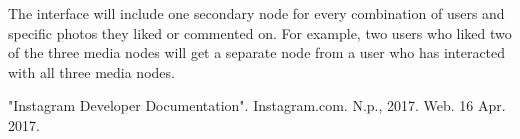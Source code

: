 \documentclass[journal]{vgtc}                %
\begin{document}
The interface will include one secondary node for every combination of users and specific photos they liked or commented on. For example, two users who liked two of the three media nodes will get a separate node from a user who has interacted with all three media nodes.




%

%
%
%


"Instagram Developer Documentation". Instagram.com. N.p., 2017. Web. 16 Apr. 2017.
\end{document}
